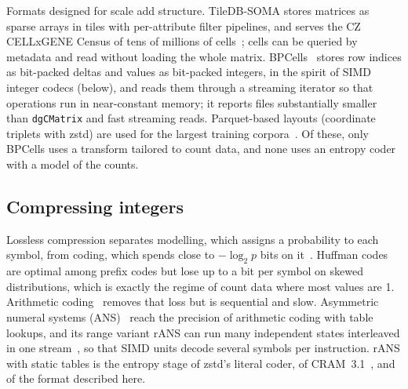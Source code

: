 Formats designed for scale add structure. TileDB-SOMA stores matrices as sparse arrays in tiles with per-attribute
filter pipelines, and serves the CZ CELLxGENE Census of tens of millions of cells~\cite{czi2025cellxgene,tiledbsoma};
cells can be queried by metadata and read without loading the whole matrix. BPCells~\cite{parks2025bpcells} stores
row indices as bit-packed deltas and values as bit-packed integers, in the spirit of SIMD integer codecs (below), and
reads them through a streaming iterator so that operations run in near-constant memory; it reports files substantially
smaller than \texttt{dgCMatrix} and fast streaming reads. Parquet-based layouts
(coordinate triplets with zstd) are used for the largest training corpora~\cite{zhang2025tahoe}. Of these, only
BPCells uses a transform tailored to count data, and none uses an entropy coder with a model of the counts.

\subsection{Compressing integers}

Lossless compression separates modelling, which assigns a probability to each symbol, from coding, which spends close
to $-\log_2 p$ bits on it~\cite{shannon1948mathematical,cover2006elements}. Huffman codes~\cite{huffman1952method} are
optimal among prefix codes but lose up to a bit per symbol on skewed distributions, which is exactly the regime of
count data where most values are 1. Arithmetic coding~\cite{rissanen1979arithmetic,witten1987arithmetic} removes that
loss but is sequential and slow. Asymmetric numeral systems (ANS)~\cite{duda2009asymmetric,duda2013asymmetric} reach
the precision of arithmetic coding with table lookups, and its range variant rANS can run many independent states
interleaved in one stream~\cite{giesen2014interleaved}, so that SIMD units decode several symbols per instruction.
rANS with static tables is the entropy stage of zstd's literal coder, of CRAM~3.1~\cite{bonfield2022cram}, and of the
format described here.

